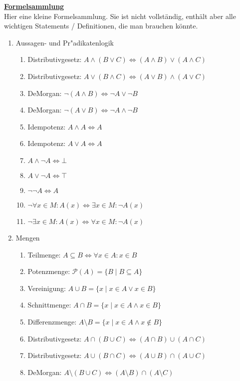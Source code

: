 \underline{\textbf{Formelsammlung}}\\
Hier eine kleine Formelsammlung. Sie ist nicht vollständig, enthält aber alle wichtigen Statements / Definitionen, die man brauchen könnte.
\begin{enumerate}
\item Aussagen- und Pr"adikatenlogik
\begin{enumerate}
    \item Distributivgesetz: $A\wedge (B \vee C) \Leftrightarrow (A\wedge B) \vee (A\wedge C)$
    \item Distributivgesetz: $A\vee (B \wedge C) \Leftrightarrow (A\vee B) \wedge (A\vee C)$
    \item DeMorgan: $\neg(A\wedge B) \Leftrightarrow \neg A \vee \neg B$
    \item DeMorgan: $\neg(A\vee B) \Leftrightarrow \neg A \wedge \neg B$
    \item Idempotenz: $A\wedge A \Leftrightarrow A$
    \item Idempotenz: $A\vee A \Leftrightarrow A$
    \item $A\wedge \neg A \Leftrightarrow \bot$
    \item $A\vee \neg A \Leftrightarrow \top$
    \item $\neg\neg A \Leftrightarrow A$
    \item $\neg\forall x\in M: A(x) \Leftrightarrow \exists x\in M: \neg A(x)$
    \item $\neg\exists x\in M: A(x) \Leftrightarrow \forall x\in M: \neg A(x)$
\end{enumerate}
\item Mengen
\begin{enumerate}
    \item Teilmenge: $A\subseteq B \Leftrightarrow \forall x\in A: x\in B$
    \item Potenzmenge: $\mathscr{P}(A) = \{B\mid B\subseteq A\}$
    \item Vereinigung: $A\cup B = \{x\mid x\in A \vee x\in B\}$
    \item Schnittmenge: $A\cap B = \{x\mid x\in A \wedge x\in B\}$
    \item Differenzmenge: $A\setminus B = \{x\mid x\in A \wedge x\notin B\}$
    \item Distributivgesetz: $A\cap (B \cup C) \Leftrightarrow (A\cap B) \cup (A\cap C)$
    \item Distributivgesetz: $A\cup (B \cap C) \Leftrightarrow (A\cup B) \cap (A\cup C)$
    \item DeMorgan: $A\setminus (B\cup C) \Leftrightarrow (A\setminus B) \cap (A\setminus C)$

\end{enumerate}
\end{enumerate}
